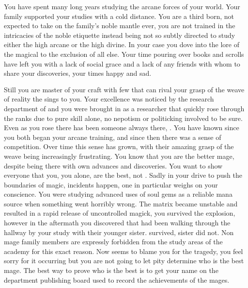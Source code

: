 \documentclass[char]{guildcamp3}
\begin{document}
\name{\cMageOne{}}


You have spent many long years studying the arcane forces of your world. Your family supported your studies with a cold distance. You are a third born, not expected to take on the family's noble mantle ever, you are not trained in the intricacies of the noble etiquette instead being not so subtly directed to study either the high arcane or the high divine. In your case you dove into the lore of the magical to the exclusion of all else. Your time pouring over books and scrolls have left you with a lack of social grace and a lack of any friends with whom to share your discoveries, your times happy and sad. 

Still you are master of your craft with few that can rival your grasp of the weave of reality the sings to you. Your excellence was noticed by the research department of \bMagicWorld{} and you were brought in as a researcher that quickly rose through the ranks due to pure skill alone, no nepotism or politicking involved to be sure. Even as you rose there has been someone always there, \cMageTwo{\intro}. You have known \cMageTwo{\them} since you both began your arcane training, and since then there was a sense of competition. Over time this sense has grown, with their amazing grasp of the weave being increasingly frustrating. You know that you are the better mage, despite \cMageTwo{\them} being there with \cMageTwo{\their} own advances and discoveries. You want to show everyone that you, you alone, are the best, not \cMageTwo{\them}. Sadly in your drive to push the boundaries of magic, incidents happen, one in particular weighs on your conscience. You were studying advanced uses of soul gems as a reliable mana source when something went horribly wrong. The matrix became unstable and resulted in a rapid release of uncontrolled magick, you survived the explosion, however in the aftermath you discovered that \cMageTwo{} had been walking through the hallway by your study with their younger sister. \cMageTwo{} survived,  sister did not. Non mage family members are expressly forbidden from the study areas of the academy for this exact reason. Now \cMageTwo{} seems to blame you for the tragedy, you feel sorry for it occurring but you are not going to let pity determine who is the best mage. The best way to prove who is the best is to get your name on the department publishing board used to record the achievements of the mages.
\end{document}
